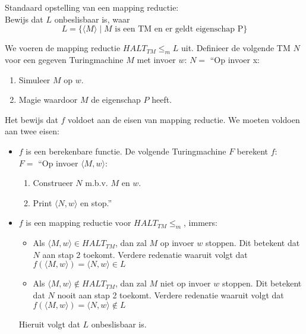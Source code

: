\documentclass[]{article}
\begin{document}
\begin{itemize}
\begin{description}
	Standaard opstelling van een mapping reductie:\\
	Bewijs dat $L$ onbeslisbaar is, waar
	$$L = \{ \langle M \rangle \mid M \mbox{ is een TM en er geldt eigenschap P}\}$$ 

	We voeren de mapping reductie $HALT_{TM} \leq_m L$ uit.
	Definieer de volgende TM $N$ voor een gegeven Turingmachine $M$ met invoer $w$:
	$N = $ ``Op invoer x:
	\begin{enumerate}
		\item Simuleer $M$ op $w$.
		\item Magie waardoor $M$ de eigenschap $P$ heeft.
	\end{enumerate}
	
	Het bewijs dat $f$ voldoet aan de eisen van mapping reductie. We moeten voldoen aan twee eisen:
	\begin{itemize}
		\item $f$ is een berekenbare functie. De volgende Turingmachine $F$ berekent $f$: \\
		$F = $ ``Op invoer $\langle M, w \rangle$:
		\begin{enumerate}
			\item Construeer $N$ m.b.v. $M$ en $w$.
			\item Print $\langle N, w \rangle$ en stop.''
		\end{enumerate}
		
		\item $f$ is een mapping reductie voor $HALT_{TM} \leq_m$, immers:
		\begin{itemize}
			\item Als $\langle M, w \rangle \in HALT_{TM}$, dan zal $M$ op invoer $w$ stoppen. Dit betekent dat $N$ aan stap 2 toekomt. Verdere redenatie waaruit volgt dat $f( \langle M, w \rangle ) = \langle N, w \rangle \in L$
			\item Als $\langle M, w \rangle \notin HALT_{TM}$, dan zal $M$ niet op invoer $w$ stoppen. Dit betekent dat $N$ nooit aan stap 2 toekomt. Verdere redenatie waaruit volgt dat $f( \langle M, w \rangle ) = \langle N, w \rangle \notin L$
		\end{itemize}
	Hieruit volgt dat $L$ onbeslisbaar is.
	\end{itemize}
\end{description}
\end{itemize}
\end{document}

